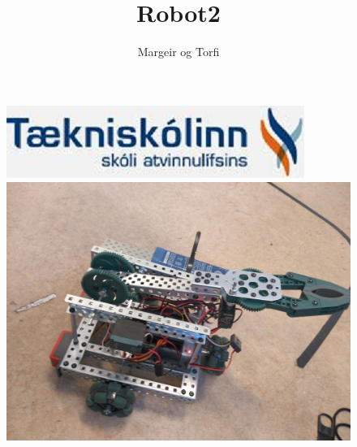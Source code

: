 \documentclass{article}
\begin{document}
\title {Robot2}
\author{Margeir og Torfi}
\maketitle
\begin{figure}[h]
\centering
\includegraphics[scale=.65]{img/tskoli}
\noindent\includegraphics[scale=.65]{img/cookedboot}
\end{figure}
\newpage
\tableofcontents
\newpage




\end{document}
